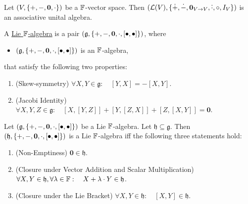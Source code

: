 \documentclass[11pt,reqno]{amsart}
\newcommand{\pwplus}{\mathbin{\dot{+}}}
\newcommand{\pwminus}{\mathbin{\dot{-}}}
\newcommand{\pwcdot}{\mathbin{\dot{\cdot}}}
\begin{document}
\begin{Prop}
\label{prop:LV-assoc-unital-alg}
Let
$\Br{V,\set{+,-,\bm0,\cdot}}$
be a $\mathbb{F}$-vector space.
Then
$\Br{\L(V),\set{\pwplus,\pwminus,\bm0_{V\to V},\pwcdot,\circ,I_V}}$
is an associative unital algebra.
\end{Prop}

\begin{Def}
A \ul{Lie $\mathbb{F}$-algebra}
is a pair $\Br{\mathfrak{g},\set{+,-,\bm0,\cdot,[\bullet,\bullet]}}$, where
\begin{itemize}
\item $\Br{\mathfrak{g},\set{+,-,\bm0,\cdot,[\bullet,\bullet]}}$
is an $\mathbb{F}$-algebra,
\end{itemize}
that satisfy the following two properties:
\begin{enumerate}
\item (Skew‑symmetry)
$\forall X,Y\in\mathfrak{g}:\quad [Y,X]=-[X,Y]$.
\item (Jacobi Identity)
$\forall X,Y,Z\in\mathfrak{g}:\quad
[X,[Y,Z]]+[Y,[Z,X]]+[Z,[X,Y]]=\mathbf{0}$.
\end{enumerate}
\end{Def}

\begin{Thm}\label{thm:Lie-subalg-test}
Let $\Br{\mathfrak{g},\set{+,-,\bm0,\cdot,[\bullet,\bullet]}}$ be a Lie $\mathbb{F}$-algebra.
Let $\mathfrak{h}\subseteq\mathfrak{g}$.
Then $\Br{\mathfrak{h},\set{+,-,\bm0,\cdot,[\bullet,\bullet]}}$ is a Lie $\mathbb{F}$-algebra iff the following three statements hold:
\begin{enumerate}
\item (Non-Emptiness) $\bm0\in\mathfrak{h}$.
\item (Closure under Vector Addition and Scalar Multiplication)
$\forall X,Y\in\mathfrak{h},\forall\lambda\in\mathbb{F}:\quad X+\lambda\cdot Y\in\mathfrak{h}$.
\item (Closure under the Lie Bracket)
$\forall X,Y\in\mathfrak{h}:\quad [X,Y]\in\mathfrak{h}$.
\end{enumerate}
\end{Thm}
\end{document}
